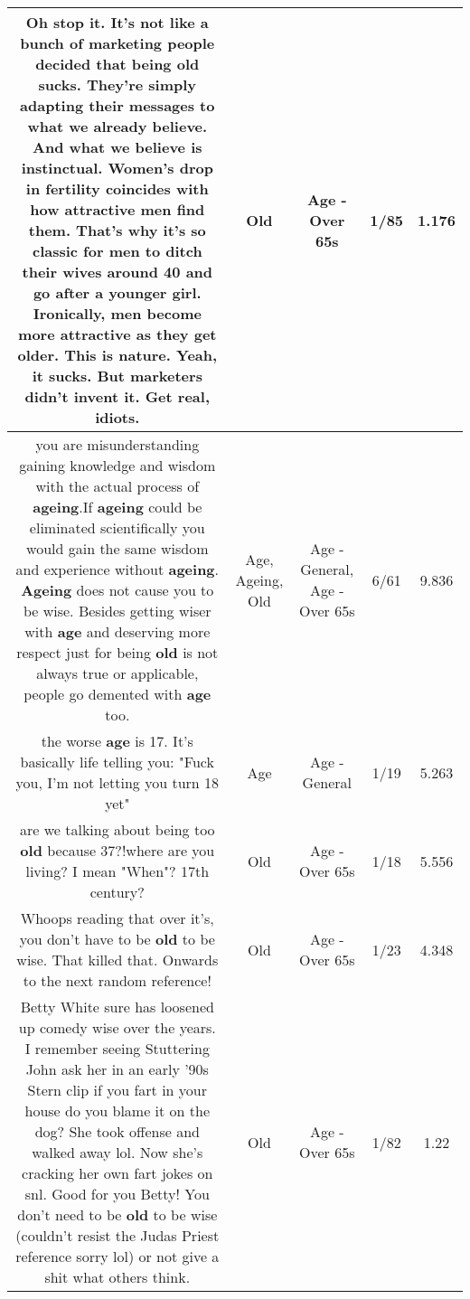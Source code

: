 \documentclass[11pt]{article}
\newlength\mylength
\begin{document}
\begin{center}
\begin{longtable}{|C{.65\mylength}|C{.30\mylength}|C{.12\mylength}|C{.12\mylength}|C{.12\mylength}|}
  \small Oh stop it. It's not like a bunch of marketing people decided that being \textbf{old} sucks. They're simply adapting their messages to what we already believe. And what we believe is instinctual. Women's drop in fertility coincides with how attractive men find them. That's why it's so classic for men to ditch their wives around 40 and go after a younger girl. Ironically, men become more attractive as they get older. This is nature. Yeah, it sucks. But marketers didn't invent it. Get real, idiots.\normalsize   & Old & Age - Over 65s & 1/85 & 1.176 \\  \hline
  \small you are misunderstanding gaining knowledge and wisdom with the actual process of \textbf{ageing}.If \textbf{ageing} could be eliminated scientifically you would gain the same wisdom and experience without \textbf{ageing}. \textbf{Ageing} does not cause you to be wise. Besides getting wiser with \textbf{age} and deserving more respect just for being \textbf{old} is not always true or applicable, people go demented with \textbf{age} too.\normalsize   & Age, Ageing, Old & Age - General, Age - Over 65s & 6/61 & 9.836 \\  \hline
  \small the worse \textbf{age} is 17. It's basically life telling you: "Fuck you, I'm not letting you turn 18 yet"\normalsize   & Age & Age - General & 1/19 & 5.263 \\  \hline
  \small are we talking about being too \textbf{old} because 37?!where are you living? I mean "When"? 17th century?\normalsize   & Old & Age - Over 65s & 1/18 & 5.556 \\  \hline
  \small Whoops reading that over it's, you don't have to be \textbf{old} to be wise. That killed that. Onwards to the next random reference!\normalsize   & Old & Age - Over 65s & 1/23 & 4.348 \\  \hline
  \small Betty White sure has loosened up comedy wise over the years. I remember seeing Stuttering John ask her in an early '90s Stern clip if you fart in your house do you blame it on the dog? She took offense and walked away lol. Now she's cracking her own fart jokes on snl. Good for you Betty! You don't need to be \textbf{old} to be wise (couldn't resist the Judas Priest reference sorry lol) or not give a shit what others think.\normalsize   & Old & Age - Over 65s & 1/82 & 1.22 \\  \hline

\end{longtable}
\end{center}
\end{document}
